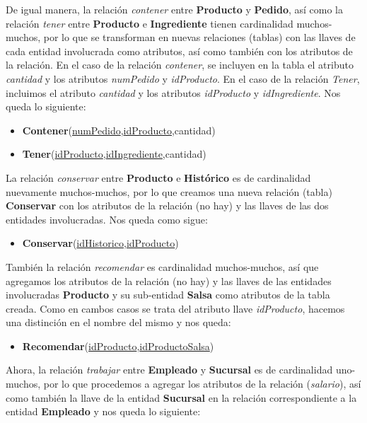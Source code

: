 \documentclass[11pt,letterpaper]{article}
\begin{document}
De igual manera, la relación \textit{contener} entre \textbf{Producto} y \textbf{Pedido}, así como la relación \textit{tener} entre \textbf{Producto} e \textbf{Ingrediente} tienen cardinalidad muchos-muchos, por lo que se transforman en nuevas relaciones (tablas) con las llaves de cada entidad involucrada como atributos, así como también con los atributos de la relación. En el caso de la relación \textit{contener}, se incluyen en la tabla el atributo \textit{cantidad} y los atributos \textit{numPedido} y \textit{idProducto}. En el caso de la relación \textit{Tener}, incluimos el atributo \textit{cantidad} y los atributos \textit{idProducto} y \textit{idIngrediente}. Nos queda lo siguiente:


\begin{itemize}
\item \footnotesize{\textbf{Contener}(\underline{numPedido},\underline{idProducto},cantidad)}
\item \footnotesize{\textbf{Tener}(\underline{idProducto},\underline{idIngrediente},cantidad)}
\end{itemize}

La relación \textit{conservar} entre \textbf{Producto} e \textbf{Histórico} es de cardinalidad nuevamente muchos-muchos, por lo que creamos una nueva relación (tabla) \textbf{Conservar} con los atributos de la relación (no hay) y las llaves de las dos entidades involucradas. Nos queda como sigue:

\begin{itemize}
\item \footnotesize{\textbf{Conservar}(\underline{idHistorico},\underline{idProducto})}
\end{itemize}


También la relación \textit{recomendar} es cardinalidad muchos-muchos, así que agregamos los atributos de la relación (no hay) y las llaves de las entidades involucradas \textbf{Producto} y su sub-entidad \textbf{Salsa} como atributos de la tabla creada. Como en cambos casos se trata del atributo llave \textit{idProducto}, hacemos una distinción en el nombre del mismo y nos queda:

\begin{itemize}
\item \footnotesize{\textbf{Recomendar}(\underline{idProducto},\underline{idProductoSalsa})}
\end{itemize}

Ahora, la relación \textit{trabajar} entre \textbf{Empleado} y \textbf{Sucursal} es de cardinalidad uno-muchos, por lo que procedemos a agregar los atributos de la relación (\textit{salario}), así como también la llave de la entidad \textbf{Sucursal} en la relación correspondiente a la entidad \textbf{Empleado} y nos queda lo siguiente:
\end{document}
